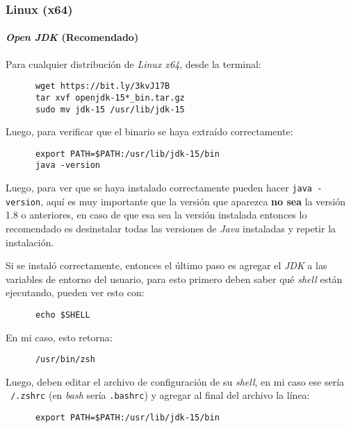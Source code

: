 \subsubsection{Linux (x64)}
  \paragraph{\textit{Open JDK} (Recomendado)}
    Para cualquier distribución de \textit{Linux x64}, desde la terminal:

    \begin{verbatim}
      wget https://bit.ly/3kvJ17B
      tar xvf openjdk-15*_bin.tar.gz
      sudo mv jdk-15 /usr/lib/jdk-15
    \end{verbatim}

    Luego, para verificar que el binario se haya extraído correctamente:

    \begin{verbatim}
      export PATH=$PATH:/usr/lib/jdk-15/bin
      java -version
    \end{verbatim}

    Luego, para ver que se haya instalado correctamente pueden hacer \texttt{java -version}, aquí es
    muy importante que la versión que aparezca \textbf{no sea} la versión 1.8 o anteriores, en caso 
    de que esa sea la versión instalada entonces lo recomendado es desinstalar todas las versiones
    de \textit{Java} instaladas y repetir la instalación.

    Si se instaló correctamente, entonces el último paso es agregar el \textit{JDK} a 
    las variables de entorno del usuario, para esto primero deben saber qué 
    \textit{shell} están ejecutando, pueden ver esto con:

    \begin{verbatim}
      echo $SHELL
    \end{verbatim}

    En mi caso, esto retorna:

    \begin{verbatim}
      /usr/bin/zsh
    \end{verbatim}

    Luego, deben editar el archivo de configuración de su \textit{shell}, en mi caso ese
    sería \texttt{~/.zshrc} (en \textit{bash} sería \texttt{.bashrc}) y 
    agregar al final del archivo la línea:
    
    \begin{verbatim}
      export PATH=$PATH:/usr/lib/jdk-15/bin
    \end{verbatim}

